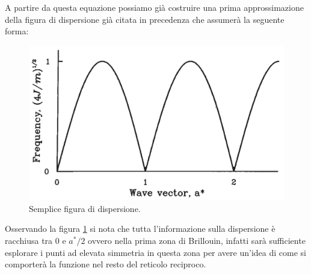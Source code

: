 \documentclass[oneside]{amsbook}
\numberwithin{section}{chapter}
\numberwithin{equation}{section}
\numberwithin{figure}{section}
\begin{document}
A partire da questa equazione possiamo già costruire una prima approssimazione della figura di dispersione già citata in precedenza che assumerà la seguente forma:
\begin{figure}[H]
\centering
\caption{Semplice figura di dispersione.}\label{acu}
\includegraphics[scale=0.5]{acu}
\end{figure}
Osservando la figura \ref{acu} si nota che tutta l'informazione sulla dispersione è racchiusa tra $0$ e $a^*/2$ ovvero nella prima zona di Brillouin, infatti sarà sufficiente esplorare i punti ad elevata simmetria in questa zona per avere un'idea di come si comporterà la funzione nel resto del reticolo reciproco. 
\end{document}
